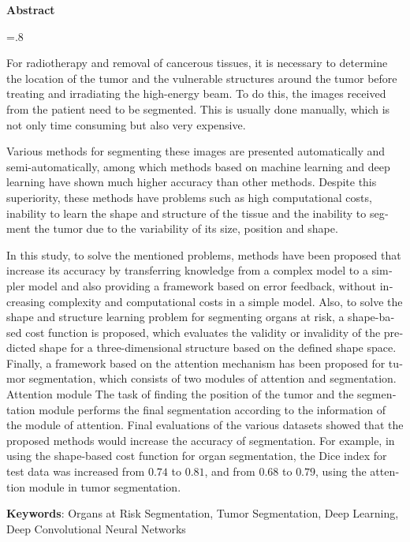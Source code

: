 


\pagestyle{empty}

\begin{latin}

\begin{center}
\textbf{Abstract}
\end{center}
\baselineskip=.8\baselineskip

For radiotherapy and removal of cancerous tissues, it is necessary to determine the location of the tumor and the vulnerable structures around the tumor before treating and irradiating the high-energy beam. To do this, the images received from the patient need to be segmented. This is usually done manually, which is not only time consuming but also very expensive.

Various methods for segmenting these images are presented automatically and semi-automatically, among which methods based on machine learning and deep learning have shown much higher accuracy than other methods. Despite this superiority, these methods have problems such as high computational costs, inability to learn the shape and structure of the tissue and the inability to segment the tumor due to the variability of its size, position and shape.

In this study, to solve the mentioned problems, methods have been proposed that increase its accuracy by transferring knowledge from a complex model to a simpler model and also providing a framework based on error feedback, without increasing complexity and computational costs in a simple model. Also, to solve the shape and structure learning problem for segmenting organs at risk, a shape-based cost function is proposed, which evaluates the validity or invalidity of the predicted shape for a three-dimensional structure based on the defined shape space. Finally, a framework based on the attention mechanism has been proposed for tumor segmentation, which consists of two modules of attention and segmentation. Attention module The task of finding the position of the tumor and the segmentation module performs the final segmentation according to the information of the module of attention. Final evaluations of the various datasets showed that the proposed methods would increase the accuracy of segmentation. For example, in using the shape-based cost function for organ segmentation, the Dice index for test data was increased from $0.74$ to $0.81$, and from $0.68$ to $0.79$, using the attention module in tumor segmentation.

\bigskip\noindent\textbf{Keywords}:
Organs at Risk Segmentation, Tumor Segmentation, Deep Learning, Deep Convolutional Neural Networks

\end{latin}

\newpage
